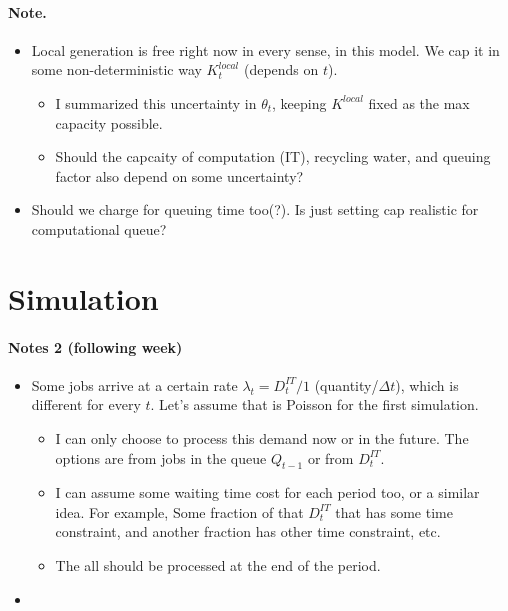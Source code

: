 \documentclass{article}
\begin{document}
\paragraph{Note.}
\begin{itemize}
    \item Local generation is free right now in every sense, in this model. We cap it in some non-deterministic way $K_t^{local}$ (depends on $t$).
    \begin{itemize}
        \item I summarized this uncertainty in $\theta_t$, keeping $K^{local}$ fixed as the max capacity possible.
        \item Should the capcaity of computation (IT), recycling water, and queuing factor also depend on some uncertainty? 
    \end{itemize}
    \item Should we charge for queuing time too(?). Is just setting cap realistic for computational queue? 
\end{itemize}


\section{Simulation}

\paragraph{Notes 2 (following week)}

\begin{itemize}
    \item Some jobs arrive at a certain rate $\lambda_t = D_t^{IT}/1 $ (quantity/$\Delta t$), which is different for every $t$. Let's assume that is Poisson for the first simulation. 

    \begin{itemize}
    \item I can only choose to process this demand now or in the future. The options are from jobs in the queue $Q_{t-1}$ or from $D_t^{IT}$. 
    \item I can assume some waiting time cost for each period too, or a similar idea. For example, Some fraction of that $D_t^{IT}$ that has some time constraint, and another fraction has other time constraint, etc.
    \item The all should be processed at the end of the period.
    \end{itemize}

    \item 
    
\end{itemize}
\end{document}

